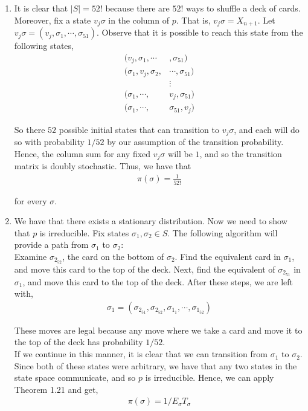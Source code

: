 \documentclass[12pt]{article}
\begin{document}
\begin{enumerate}[label=(\Alph*)]
\item It is clear that $|S| = 52!$ because there are $52!$ ways to shuffle a deck of cards.\\

Moreover, fix a state $v_j \sigma$ in the column of $p$. That is, $v_j \sigma = X_{n+1}$. Let $v_j \sigma = (v_j, \sigma_1, \cdots, \sigma_51)$. Observe that it is possible to reach this state from the following states,
\begin{align*}
(v_j, \sigma_1, \cdots&, \sigma_{51})\\
(\sigma_1, v_j, \sigma_2, &\cdots, \sigma_{51})\\
&\vdots\\
(\sigma_1, \cdots, &v_j, \sigma_{51})\\
(\sigma_1, \cdots, &\sigma_{51}, v_j)
\end{align*}

So there $52$ possible initial states that can transition to $v_j \sigma$, and each will do so with probability $1/52$ by our assumption of the transition probability. Hence, the column sum for any fixed $v_j \sigma$ will be $1$, and so the transition matrix is doubly stochastic. Thus, we have that
\begin{align*}
\pi(\sigma) = \frac{1}{52!}
\end{align*}

for every $\sigma$.
\newpage
\item We have that there exists a stationary distribution. Now we need to show that $p$ is irreducible. Fix states $\sigma_1, \sigma_2 \in S$. The following algorithm will provide a path from $\sigma_1$ to $\sigma_2$:\\

Examine $\sigma_{2_{52}}$, the card on the bottom of $\sigma_2$. Find the equivalent card in $\sigma_1$, and move this card to the top of the deck. Next, find the equivalent of $\sigma_{2_{51}}$ in $\sigma_1$, and move this card to the top of the deck. After these steps, we are left with,
\begin{align*}
\sigma_1 = (\sigma_{2_{51}}, \sigma_{2_{52}}, \sigma_{1_1}, \cdots, \sigma_{1_{52}})
\end{align*}

These moves are legal because any move where we take a card and move it to the top of the deck has probability $1/52$.\\

If we continue in this manner, it is clear that we can transition from $\sigma_1$ to $\sigma_2$. Since both of these states were arbitrary, we have that any two states in the state space communicate, and so $p$ is irreducible. Hence, we can apply Theorem 1.21 and get,
\begin{align*}
\pi(\sigma) = 1/E_{\sigma}T_{\sigma}
\end{align*}


\end{enumerate}
\end{document}
